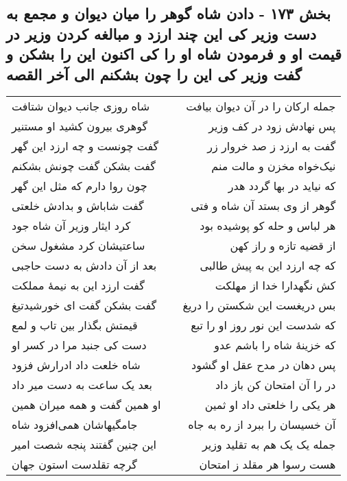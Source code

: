 \begin{center}
\section*{بخش ۱۷۳ - دادن شاه گوهر را میان دیوان و مجمع به دست وزیر کی این چند ارزد و مبالغه کردن وزیر در قیمت او و فرمودن شاه او را کی اکنون این را بشکن و گفت وزیر کی این را چون بشکنم الی آخر القصه}
\label{sec:sh173}
\begin{longtable}{l p{0.5cm} r}
شاه روزی جانب دیوان شتافت
&&
جمله ارکان را در آن دیوان بیافت
\\
گوهری بیرون کشید او مستنیر
&&
پس نهادش زود در کف وزیر
\\
گفت چونست و چه ارزد این گهر
&&
گفت به ارزد ز صد خروار زر
\\
گفت بشکن گفت چونش بشکنم
&&
نیک‌خواه مخزن و مالت منم
\\
چون روا دارم که مثل این گهر
&&
که نیاید در بها گردد هدر
\\
گفت شاباش و بدادش خلعتی
&&
گوهر از وی بستد آن شاه و فتی
\\
کرد ایثار وزیر آن شاه جود
&&
هر لباس و حله کو پوشیده بود
\\
ساعتیشان کرد مشغول سخن
&&
از قضیه تازه و راز کهن
\\
بعد از آن دادش به دست حاجبی
&&
که چه ارزد این به پیش طالبی
\\
گفت ارزد این به نیمهٔ مملکت
&&
کش نگهدارا خدا از مهلکت
\\
گفت بشکن گفت ای خورشیدتیغ
&&
بس دریغست این شکستن را دریغ
\\
قیمتش بگذار بین تاب و لمع
&&
که شدست این نور روز او را تبع
\\
دست کی جنبد مرا در کسر او
&&
که خزینهٔ شاه را باشم عدو
\\
شاه خلعت داد ادرارش فزود
&&
پس دهان در مدح عقل او گشود
\\
بعد یک ساعت به دست میر داد
&&
در را آن امتحان کن باز داد
\\
او همین گفت و همه میران همین
&&
هر یکی را خلعتی داد او ثمین
\\
جامگیهاشان همی‌افزود شاه
&&
آن خسیسان را ببرد از ره به جاه
\\
این چنین گفتند پنجه شصت امیر
&&
جمله یک یک هم به تقلید وزیر
\\
گرچه تقلدست استون جهان
&&
هست رسوا هر مقلد ز امتحان
\\
\end{longtable}
\end{center}
